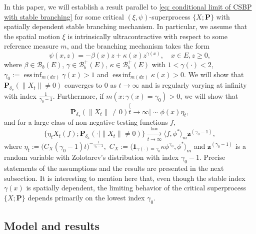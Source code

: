 \documentclass[12pt, a4paper]{amsart}
\theoremstyle{definition}
\numberwithin{equation}{section}
\begin{document}
	In this paper, we will establish a result parallel to \eqref{eq: conditional limit of CSBP with stable branching} for some critical $(\xi,\psi)$-superprocess $\{X; \mathbf P\}$ with spatially dependent stable branching mechanism.
	In particular, we assume that the spatial motion $\xi$ is intrinsically ultracontractive with respect to some reference measure $m$, and the branching mechanism takes the form
\begin{equation}
	\psi(x,z) = -\beta (x) z + \kappa(x) z^{\gamma(x)},
	\quad x\in E, z \geq 0,
\end{equation}
	where $\beta \in \mathscr B_b(E)$, $\gamma \in \mathscr B^+_b(E)$, $\kappa \in \mathscr B^+_b(E)$ with $1< \gamma(\cdot )<2$, $\gamma_0 := \operatorname{ess\,inf}_{m(dx)} \gamma(x)> 1$ and $\operatorname{ess\,inf}_{m(dx)}\kappa(x) > 0$.
	We will show that $\mathbf P_{\delta_x}( \| X_t\| \neq 0) $ converges to $0$ as $t\to \infty$ and is regularly varying at infinity with index $\frac{1}{\gamma_0 - 1}$.
	Furthermore, if $m(x: \gamma(x) = \gamma_0)>0$, we will show that
\begin{equation}
	\mathbf P_{\delta_x}( \|X_t\| \neq0)
	\stackrel[t\to \infty]{}{\sim} \phi(x) \eta_t,
\end{equation}
	and for a large class of non-negative testing functions $f$,
\begin{equation}\label{eq: result2}
	\{ \eta_t X_t(f) ; \mathbf P_{\delta_x}(\cdot | \|X_t\|\neq 0) \}
	\xrightarrow[t\to \infty]{\operatorname{law}}
	\langle f, \phi^*\rangle_m \mathbf z^{(\gamma_0 - 1)},
\end{equation}
	where $\eta_t := \big( C_X(\gamma_0 - 1) t \big)^{- \frac {1} {\gamma_0 - 1} },$ $C_X := \langle \mathbf 1_{\gamma(\cdot) = \gamma_0} \kappa \phi^{\gamma_0}, \phi^* \rangle_m$ and $\mathbf z^{(\gamma_0 - 1)}$ is a random variable with Zolotarev's distribution with index $\gamma_0 - 1$.
	Precise statements of the assumptions and the results are presented in the next subsection.
    It is interesting to mention here that, even though the stable index $\gamma(x)$ is spatially dependent, the limiting behavior of the critical superprocess $\{X; \mathbf P\}$ depends primarily on the lowest index $\gamma_0$.
	
\subsection{Model and results}
\end{document}
